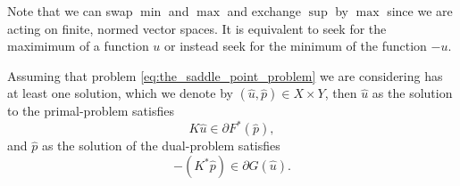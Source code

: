     Note that we can swap $\min$ and $\max$ and exchange $\sup$ by $\max$ since we are acting on finite, normed vector spaces. It is equivalent to seek for the maximimum of a function $u$ or instead seek for the minimum of the function $-u$.



    Assuming that problem \ref{eq:the_saddle_point_problem} we are considering has at least one solution, which we denote by $(\hat{u}, \hat{p}) \in X \times Y$, then $\hat{u}$ as the solution to the primal-problem satisfies
        \begin{equation}
            K\hat{u} \in \partial F^{\ast}(\hat{p}),
            \label{eq:kx_in_subgradient}
        \end{equation}
    and $\hat{p}$ as the solution of the dual-problem satisfies
        \begin{equation}
            -(K^{\ast}\hat{p}) \in \partial G(\hat{u}).
            \label{eq:k_star_y_in_subgradient}
        \end{equation}
        
